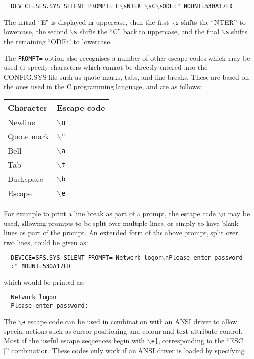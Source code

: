 {\tt \verb|  |DEVICE=SFS.SYS SILENT PROMPT="E$\backslash$sNTER $\backslash$sC$\backslash$sODE:" MOUNT=530A17FD}

The initial ``E'' is displayed in uppercase, then the first {\tt $\backslash$s} shifts the
``NTER'' to lowercase, the second {\tt $\backslash$s} shifts the ``C'' back to uppercase, and the
final {\tt $\backslash$s} shifts the remaining ``ODE:'' to lowercase.

The {\tt PROMPT=} option also recognises a number of other escape codes which may
be used to specify characters which cannot be directly entered into the
CONFIG.SYS file such as quote marks, tabs, and line breaks.  These are based on
the ones used in the C programming language, and are as follows:

\begin{center}
\begin{tabular}{|l|l|}
\hline
	Character  & Escape code \\
\hline
	Newline    & $\backslash${\tt n}\\
	Quote mark & $\backslash${\tt "}\\
	Bell       & $\backslash${\tt a}\\
	Tab        & $\backslash${\tt t}\\
	Backspace  & $\backslash${\tt b}\\
	Escape     & $\backslash${\tt e}\\
\hline
\end{tabular}
\end{center}

For example to print a line break as part of a prompt, the escape code $\backslash${\tt n} may
be used, allowing prompts to be split over multiple lines, or simply to have
blank lines as part of the prompt.  An extended form of the above prompt, split
over two lines, could be given as:

{\tt \verb|  |DEVICE=SFS.SYS SILENT PROMPT="Network logon$\backslash$nPlease enter password\\
     \verb|  |:" MOUNT=530A17FD}

which would be printed as:

{\tt \verb|  |Network logon\\
     \verb|  |Please enter password:}

The $\backslash${\tt e} escape code can be used in combination with an ANSI driver to allow
special actions such as cursor positioning and colour and text attribute
control.  Most of the useful escape sequences begin with $\backslash${\tt e[}, corresponding
to the ``ESC ['' combination.  These codes only work if an ANSI driver is loaded
by specifying

